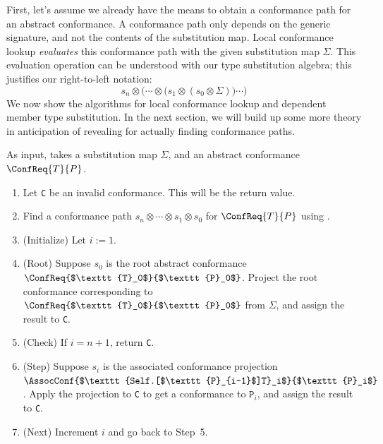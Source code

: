 \documentclass[../generics]{subfiles}
\begin{document}
First, let's assume we already have the means to obtain a conformance path for an abstract conformance. A conformance path only depends on the generic signature, and not the contents of the substitution map. Local conformance lookup \emph{evaluates} this conformance path with the given substitution map $\Sigma$. This evaluation operation can be understood with our type substitution algebra; this justifies our right-to-left notation:
\[s_n\otimes\bigl(\cdots\otimes \bigl(s_1 \otimes (s_0 \otimes \Sigma)\bigr) \cdots \bigr)\]
We now show the algorithms for local conformance lookup and dependent member type substitution. In the next section, we will build up some more theory in anticipation of revealing  for actually finding conformance paths.

\begin{algorithm}\label{local conformance lookup algorithm}
As input, takes a substitution map $\Sigma$, and an abstract conformance $\ConfReq{T}{P}$.
\begin{enumerate}
\item Let \texttt{C} be an invalid conformance. This will be the return value.
\item Find a conformance path $s_n\otimes \cdots \otimes s_1\otimes s_0$ for $\ConfReq{T}{P}$ using .
\item (Initialize) Let $i := 1$.
\item (Root) Suppose $s_0$ is the root abstract conformance $\ConfReq{$\texttt{T}_0$}{$\texttt{P}_0$}$. Project the root conformance corresponding to $\ConfReq{$\texttt{T}_0$}{$\texttt{P}_0$}$ from $\Sigma$, and assign the result to \texttt{C}.
\item (Check) If $i=n+1$, return \texttt{C}.
\item (Step) Suppose $s_i$ is the associated conformance projection $\AssocConf{$\texttt{Self.[$\texttt{P}_{i-1}$]T}_i$}{$\texttt{P}_i$}$. Apply the projection to \texttt{C} to get a conformance to $\texttt{P}_i$, and assign the result to \texttt{C}.
\item (Next) Increment $i$ and go back to Step~5.
\end{enumerate}
\end{algorithm}
\end{document}
